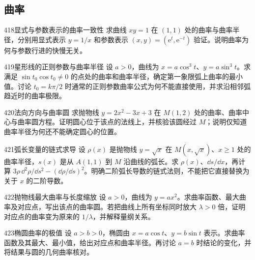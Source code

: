 \subsection{曲率}
\begin{exercise}{418}{显式与参数表示的曲率一致性}
求曲线 $xy=1$ 在 $(1,1)$ 处的曲率与曲率半径，分别用显式表示 $y=1/x$ 和参数表示 $(x,y)=(\mathrm e^t,\mathrm e^{-t})$ 验证。说明曲率为何与参数行进的快慢无关。
\end{exercise}
\begin{exercise}{419}{星形线的正则参数与曲率半径}
设 $a>0$，曲线为 $x=a\cos^3t$、$y=a\sin^3t$。求满足 $\sin t_0\cos t_0\ne0$ 的点处的曲率和曲率半径，确定第一象限弧上曲率的最小值。讨论 $t_0=k\pi/2$ 时通常的正则参数曲率公式为何不能直接使用，并求沿相邻弧趋近时的曲率极限。
\end{exercise}
\begin{exercise}{420}{法向方向与曲率圆}
求抛物线 $y=2x^2-3x+3$ 在 $M(1,2)$ 处的曲率、曲率中心与曲率圆方程。证明圆心位于该点的法线上，并核验该圆经过 $M$；说明仅知道曲率半径为何还不能确定圆心的位置。
\end{exercise}
\begin{exercise}{421}{弧长变量的链式求导}
设 $\rho(x)$ 是抛物线 $y=\sqrt x$ 在 $M(x,\sqrt x)$、$x\ge1$ 处的曲率半径，$s(x)$ 是从 $A(1,1)$ 到 $M$ 沿曲线的弧长。求 $\rho(x)$、$\dd s/\dd x$，再计算 $3\rho\,\dd^2\rho/\dd s^2-(\dd\rho/\dd s)^2$。明确二阶弧长导数的链式法则，不能把它直接替换为关于 $x$ 的二阶导数。
\end{exercise}
\begin{exercise}{422}{抛物线最大曲率与长度缩放}
设 $a>0$，曲线为 $y=ax^2$。求曲率函数、最大曲率及对应点，写出该点的曲率圆。若把曲线上所有坐标同时放大 $\lambda>0$ 倍，证明对应点的曲率变为原来的 $1/\lambda$，并解释量纲关系。
\end{exercise}
\begin{exercise}{423}{椭圆曲率的极值}
设 $a>b>0$，椭圆由 $x=a\cos t$、$y=b\sin t$ 表示。求曲率函数及其最大、最小值，给出对应点和曲率半径。再讨论 $a=b$ 时结论的变化，并将结果与圆的几何曲率核对。
\end{exercise}
